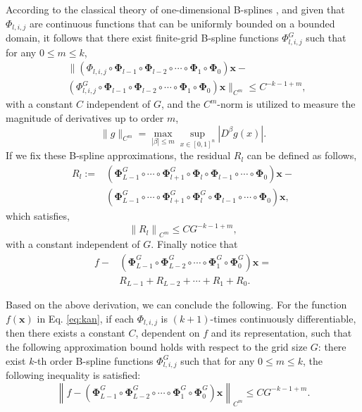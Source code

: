 \documentclass[letterpaper]{article} %
\begin{document}
According to the classical theory of one-dimensional B-splines \cite{Boor1978APG}, and given that $\Phi_{l, i, j}$ are continuous functions that can be uniformly bounded on a bounded domain, it follows that there exist finite-grid B-spline functions $\Phi_{l, i, j}^G$ such that for any $0 \leq m \leq k$,
\begin{equation*}
    \begin{aligned}
        & \| \left(\Phi_{l, i, j} \circ \boldsymbol{\Phi}_{l-1} \circ \boldsymbol{\Phi}_{l-2} \circ \cdots \circ \boldsymbol{\Phi}_1 \circ \boldsymbol{\Phi}_0\right) \mathbf{x} - \\
        & \left({\Phi}_{l, i, j}^G \circ \boldsymbol{\Phi}_{l-1} \circ \boldsymbol{\Phi}_{l-2} \circ \cdots \circ \boldsymbol{\Phi}_1 \circ \boldsymbol{\Phi}_0\right) \mathbf{x}{\|}_{C^m} \leq C^{-k-1+m},
    \end{aligned}
\end{equation*}
with a constant $C$ independent of $G$, and the $C^m$-norm is utilized to measure the magnitude of derivatives up to order $m$,
$$
 \|g\|_{C^m}=\max _{|\beta| \leq m} \sup _{x \in[0,1]^n}\left|D^\beta g(x)\right|.
$$
If we fix these B-spline approximations, the residual $R_l$ can be defined as follows,
\begin{equation*}
    \begin{aligned}
        R_l:=&\left(\boldsymbol{\Phi}_{L-1}^G \circ \cdots \circ \boldsymbol{\Phi}_{l+1}^G \circ \boldsymbol{\Phi}_l \circ \boldsymbol{\Phi}_{l-1} \circ \cdots \circ \boldsymbol{\Phi}_0\right) \mathbf{x}-\\
        &\left(\boldsymbol{\Phi}_{L-1}^G \circ \cdots \circ \boldsymbol{\Phi}_{l+1}^G \circ \boldsymbol{\Phi}_l^G \circ \boldsymbol{\Phi}_{l-1} \circ \cdots \circ \boldsymbol{\Phi}_0\right) \mathbf{x},
    \end{aligned}
\end{equation*}
which satisfies,
$$
\left\|R_l\right\|_{C^m} \leq C G^{-k-1+m},
$$
with a constant independent of $G$. Finally notice that
\begin{equation*}
    \begin{aligned}
        f-&\left(\boldsymbol{\Phi}_{L-1}^G \circ \boldsymbol{\Phi}_{L-2}^G \circ \cdots \circ \boldsymbol{\Phi}_1^G \circ \boldsymbol{\Phi}_0^G\right) \mathbf{x}=\\
        &R_{L-1}+R_{L-2}+\cdots+R_1+R_0.
    \end{aligned}
\end{equation*}

Based on the above derivation, we can conclude the following. For the function \( f(\mathbf{x}) \) in Eq. \ref{eq:kan}, if each \( \Phi_{l, i, j} \) is \((k+1)\)-times continuously differentiable, then there exists a constant \( C \), dependent on \( f \) and its representation, such that the following approximation bound holds with respect to the grid size \( G \): there exist \( k \)-th order B-spline functions \( \Phi_{l, i, j}^G \) such that for any \( 0 \leq m \leq k \), the following inequality is satisfied:
$$
\left\|f-\left(\boldsymbol{\Phi}_{L-1}^G \circ \boldsymbol{\Phi}_{L-2}^G \circ \cdots \circ \boldsymbol{\Phi}_1^G \circ \boldsymbol{\Phi}_0^G\right) \mathbf{x}\right\|_{C^m} \leq C G^{-k-1+m}.
$$
\end{document}
